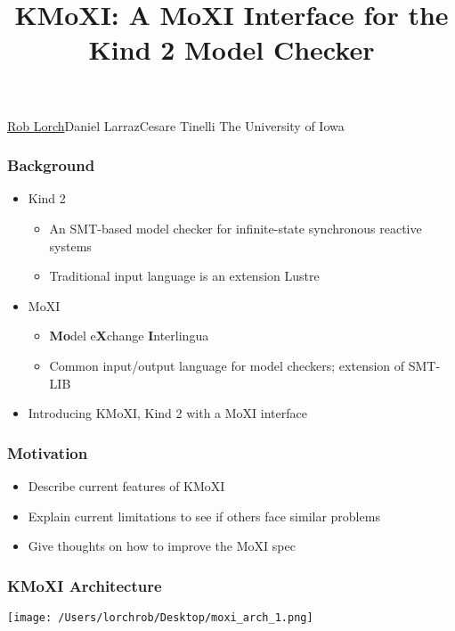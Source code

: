 \documentclass[11pt,xcolor={dvipsnames},hyperref={pdftex,pdfpagemode=UseNone,hidelinks,pdfdisplaydoctitle=true},usepdftitle=false]{beamer}
\begin{document}

\title{KMoXI: A MoXI Interface for the Kind 2 Model Checker}

\information
%  
%
{\underline{Rob Lorch}\quad Daniel Larraz\quad Cesare Tinelli
\newline \newline   
The University of Iowa
}
%

\frame{\titlepage}

\begin{frame} 
    \frametitle{Background} \pause
    \begin{itemize}
        \item Kind 2
        \begin{itemize}
            \item An SMT-based model checker for infinite-state synchronous reactive systems
            \item Traditional input language is an extension Lustre
        \end{itemize}
        \pause
        \item MoXI
        \begin{itemize}
            \item \textbf{Mo}del e\textbf{X}change \textbf{I}nterlingua
            \item Common input/output language for model checkers; extension of SMT-LIB
        \end{itemize}
        \pause
        \item Introducing KMoXI, Kind 2 with a MoXI interface
    \end{itemize}
\end{frame}

\begin{frame} 
    \frametitle{Motivation} \pause
    \begin{itemize}
        \item Describe current features of KMoXI \pause
        \item Explain current limitations to see if others face similar problems \pause 
        \item Give thoughts on how to improve the MoXI spec  
    \end{itemize}
\end{frame}

\begin{frame} 
    \frametitle{KMoXI Architecture}\pause
    \texttt{[image: /Users/lorchrob/Desktop/moxi\_arch\_1.png]}
\end{frame}
\end{document}
